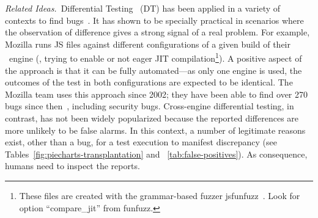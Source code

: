 \documentclass[smallextended]{svjour3}
\begin{document}

%
\emph{Related Ideas.}~Differential Testing~\cite{Brumley-etal-ss07}
(DT) has been applied in a variety of contexts to find
bugs~\cite{Yang-etal-pldi11,Chen-etal-fse2015,Argyros-etla-ccs16,Chen-etal-pldi16,petsios-etal-sp2017,SivakornAPKJ17,Zhang:2017:ATD:3097368.3097448}.
It has shown to be specially practical in scenarios where the
observation of difference gives a strong signal of a real problem. For
example, Mozilla runs JS files against different configurations of a
given build of their \smonkey\ engine (\eg{}, trying to enable or not
eager JIT compilation\footnote{These files are created with the
  grammar-based fuzzer jsfunfuzz~\cite{jsfunfuzz}. Look for option
  ``compare\_jit'' from funfuzz.}). A positive aspect of the approach
is that it can be fully automated---as only one engine is used, the
outcomes of the test in both configurations are expected to be
identical. The Mozilla team uses this approach since 2002; they have
been able to find over 270 bugs since
then~\cite{jsfunfuzz-at-mozilla}, including security
bugs. Cross-engine differential testing, in contrast, has not been
widely popularized because the reported differences are more unlikely
to be false alarms. In this context, a number of legitimate reasons
exist, other than a bug, for a test execution to manifest discrepancy
(see Tables~\ref{fig:piecharts-transplantation} and
~\ref{tab:false-positives}). As consequence, humans need to inspect
the reports.



\end{document}
